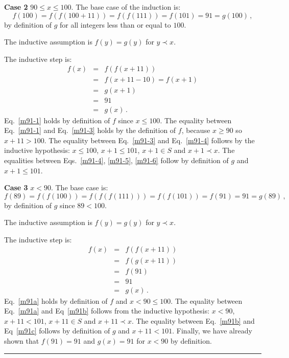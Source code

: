 \documentclass[11pt,a4paper]{report}
\newcommand*{\qed}{\hfill\rule{1ex}{1.5ex}}
\begin{document}
\textbf{Case 2} $90\leq x \leq 100$. The base case of the induction is:
\[
f(100) = f(f(100+11)) = f(f(111)) = f(101) = 91 = g(100)\,,
\]
by definition of $g$ for all integers less than or equal to $100$.

The inductive assumption is $f(y) = g(y)$ for $y\prec x$.

The inductive step is:
\vspace*{-1ex}
\begin{eqnarray}
f(x) &=& f(f(x+11))\label{m91-1}\\
&=& f(x+11-10)= f(x+1)\label{m91-3}\\
&=& g(x+1)\label{m91-4}\\
&=& 91\label{m91-5}\\
&=& g(x)\label{m91-6}\,.
\end{eqnarray}
Eq.~\ref{m91-1} holds by definition of $f$ since $x\leq 100$.
The equality between Eq.~\ref{m91-1} and Eq.~\ref{m91-3} holds by the definition of $f$, because $x \geq 90$ so $x+11 > 100$. The equality between Eq.~\ref{m91-3} and Eq.~\ref{m91-4} follows by the inductive hypothesis: $x\leq 100$, $x+1 \leq 101$, $x+1\in S$ and $x+1\prec x$. The equalities between Eqs.~\ref{m91-4}, \ref{m91-5}, \ref{m91-6} follow by definition of $g$ and $x+1 \leq 101$.

\textbf{Case 3} $x< 90$. The base case is:
\[
f(89) = f(f(100)) = f(f(f(111))) = f(f(101)) = f(91) = 91 = g(89)\,,
\]
by definition of $g$ since $89<100$.

The inductive assumption is $f(y) = g(y)$ for $y\prec x$.

The inductive step is:
\vspace*{-1ex}
\begin{eqnarray}
f(x) &=& f(f(x+11))\label{m91a}\\
&=& f(g(x+11))\label{m91b}\\
&=& f(91)\label{m91c}\\
&=& 91\label{m91d}\\
&=& g(x)\,.
\end{eqnarray}
Eq.~\ref{m91a} holds by definition of $f$ and $x<90\leq 100$.
The equality between Eq.~\ref{m91a} and Eq~\ref{m91b} follows from the inductive hypothesis: $x < 90$, $x+11< 101$, $x+11\in S$ and $x+11 \prec x$. The equality between Eq.~\ref{m91b} and Eq~\ref{m91c} follows by definition of $g$ and $x+11 < 101$. Finally, we have already shown that $f(91)=91$ and $g(x)=91$ for $x<90$ by definition.\qed


\end{document}

